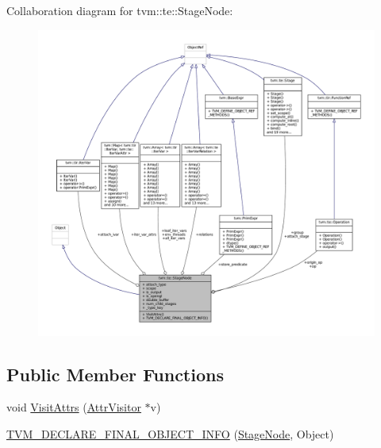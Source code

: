 Collaboration diagram for tvm\+:\+:te\+:\+:Stage\+Node\+:
\nopagebreak
\begin{figure}[H]
\begin{center}
\leavevmode
\includegraphics[width=350pt]{classtvm_1_1te_1_1StageNode__coll__graph}
\end{center}
\end{figure}
\subsection*{Public Member Functions}
\begin{DoxyCompactItemize}
\item 
void \hyperlink{classtvm_1_1te_1_1StageNode_ae86cbe717f924c4e30cef2a1a086308a}{Visit\+Attrs} (\hyperlink{classtvm_1_1AttrVisitor}{Attr\+Visitor} $\ast$v)
\item 
\hyperlink{classtvm_1_1te_1_1StageNode_a51b9748fd004dc2f3fcb23163eb78e0f}{T\+V\+M\+\_\+\+D\+E\+C\+L\+A\+R\+E\+\_\+\+F\+I\+N\+A\+L\+\_\+\+O\+B\+J\+E\+C\+T\+\_\+\+I\+N\+FO} (\hyperlink{classtvm_1_1te_1_1StageNode}{Stage\+Node}, Object)
\end{DoxyCompactItemize}
